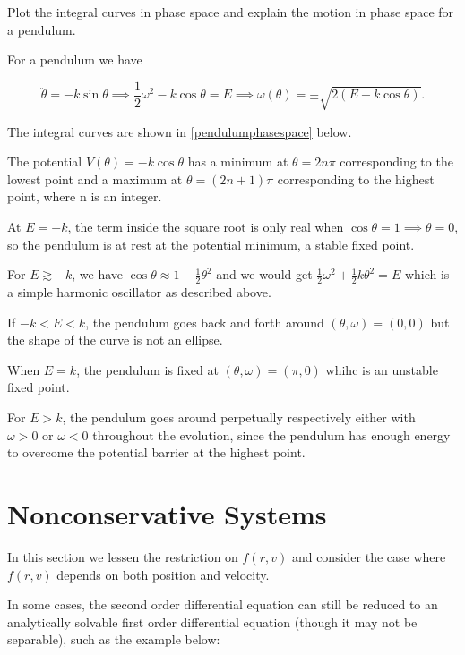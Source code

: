 \documentclass[english,a4paper,12pt]{report}
\begin{document}
{Plot the integral curves in phase space and explain the motion in phase space for a pendulum.}
{For a pendulum we have

\begin{equation}
    \ddot{\theta } = -k\sin \theta \implies \frac{1}{2}\omega ^2-k\cos \theta = E \implies \omega (\theta ) = \pm \sqrt{2(E+k\cos \theta )}.   
\end{equation}

The integral curves are shown in \cref{pendulumphasespace} below.

The potential \(V(\theta ) = -k\cos \theta \) has a minimum at \(\theta = 2n\pi \) corresponding to the lowest point and a maximum at \(\theta = (2n+1)\pi \) corresponding to the highest point, where n is an integer. 

At \(E = -k\), the term inside the square root is only real when \(\cos \theta = 1 \implies \theta = 0\), so the pendulum is at rest at the potential minimum, a stable fixed point. 

For \(E \gtrsim -k\), we have \(\cos \theta \approx 1-\frac{1}{2}\theta ^2 \) and we would get \(\frac{1}{2}\omega ^2 + \frac{1}{2}k \theta ^2 = E  \) which is a simple harmonic oscillator as described above. 

If \(-k < E < k\), the pendulum goes back and forth around \((\theta ,\omega ) = (0,0)\) but the shape of the curve is not an ellipse.

When \(E = k\), the pendulum is fixed at \((\theta ,\omega ) = (\pi ,0)\) whihc is an unstable fixed point.

For \(E>k\), the pendulum goes around perpetually respectively either with \(\omega > 0 \text { or } \omega <0\) throughout the evolution, since the pendulum has enough energy to overcome the potential barrier at the highest point.


} 

\section{Nonconservative Systems}

In this section we lessen the restriction on \(f(r,v)\) and consider the case where \(f(r,v)\) depends on both position and velocity.  

In some cases, the second order differential equation can still be reduced to an analytically solvable first order differential equation (though it may not be separable), such as the example below:
\end{document}
